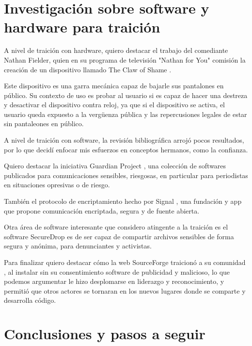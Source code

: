 \documentclass{article}
\begin{document}
\clearpage

\section{Investigación sobre software y hardware para traición}

A nivel de traición con hardware, quiero destacar el trabajo del comediante Nathan Fielder, quien en su programa de televisión "Nathan for You" comisión la creación de un dispositivo llamado The Claw of Shame \cite{clawOfShame}.

Este dispositivo es una garra mecánica capaz de bajarle sus pantalones en público. Su contexto de uso es probar al usuario si es capaz de hacer una destreza y desactivar el dispositivo contra reloj, ya que si el dispositivo se activa, el usuario queda expuesto a la vergüenza pública y las repercusiones legales de estar sin pantaleones en público.

A nivel de traición con software, la revisión bibliográfica arrojó pocos resultados, por lo que decidí enfocar mis esfuerzos en conceptos hermanos, como la confianza.

Quiero destacar la iniciativa Guardian Project \cite{guardianProject}, una colección de softwares publicados para comunicaciones sensibles, riesgosas, en particular para periodistas en situaciones opresivas o de riesgo.

También el protocolo de encriptamiento hecho por Signal \cite{signal}, una fundación y app que propone comunicación encriptada, segura y de fuente abierta.

Otra área de software interesante que considero atingente a la traición es el software SecureDrop \cite{secureDrop} es de ser capaz de compartir archivos sensibles de forma segura y anónima, para denunciantes y activistas.

Para finalizar quiero destacar cómo la web SourceForge \cite{sourceForgeWiki}  traicionó a su comunidad \cite{sourceForgeArs}, al instalar sin su consentimiento software de publicidad y malicioso, lo que podemos argumentar le hizo desplomarse en liderazgo y reconocimiento, y permitió que otros actores se tornaran en los nuevos lugares donde se comparte y desarrolla código.

\clearpage

\section{Conclusiones y pasos a seguir}
\end{document}
